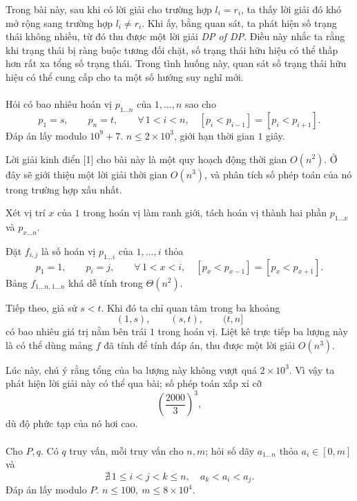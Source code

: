 \documentclass[11pt]{article}
\begin{document}
Trong bài này, sau khi có lời giải cho trường hợp \(l_i=r_i\), ta thấy lời
giải đó khó mở rộng sang trường hợp \(l_i\ne r_i\). Khi ấy, bằng quan sát, ta
phát hiện số trạng thái không nhiều, từ đó thu được một lời giải
\emph{DP of DP}. Điều này nhắc ta rằng khi trạng thái bị ràng buộc tương đối
chặt, số trạng thái hữu hiệu có thể thấp hơn rất xa tổng số trạng thái. Trong
tình huống này, quan sát số trạng thái hữu hiệu có thể cung cấp cho ta một số
hướng suy nghĩ mới.

\paragraph{}
Hỏi có bao nhiêu hoán vị \(p_{1\ldots n}\) của \(1,\ldots,n\) sao cho
\[
  p_1=s,\qquad p_n=t,\qquad
  \forall\,1<i<n,\quad [p_i<p_{i-1}]=[p_i<p_{i+1}].
\]
Đáp án lấy modulo \(10^9+7\). \(n\le 2\times 10^3\), giới hạn thời gian
\(1\) giây.

Lời giải kinh điển [1] cho bài này là một quy hoạch động thời gian \(O(n^2)\).
Ở đây sẽ giới thiệu một lời giải thời gian \(O(n^3)\), và phân tích số phép
toán của nó trong trường hợp xấu nhất.

Xét vị trí \(x\) của \(1\) trong hoán vị làm ranh giới, tách hoán vị thành hai
phần \(p_{1\ldots x}\) và \(p_{x\ldots n}\).

Đặt \(f_{i,j}\) là số hoán vị \(p_{1\ldots i}\) của \(1,\ldots,i\) thỏa
\[
  p_1=1,\qquad p_i=j,\qquad
  \forall\,1<x<i,\quad [p_x<p_{x-1}]=[p_x<p_{x+1}].
\]
Bảng \(f_{1\ldots n,1\ldots n}\) khá dễ tính trong \(\Theta(n^2)\).

Tiếp theo, giả sử \(s<t\). Khi đó ta chỉ quan tâm trong ba khoảng
\[
  (1,s),\qquad (s,t),\qquad (t,n]
\]
có bao nhiêu giá trị nằm bên trái \(1\) trong hoán vị. Liệt kê trực tiếp ba
lượng này là có thể dùng mảng \(f\) đã tính để tính đáp án, thu được một lời
giải \(O(n^3)\).

Lúc này, chú ý rằng tổng của ba lượng này không vượt quá \(2\times 10^3\). Vì
vậy ta phát hiện lời giải này có thể qua bài; số phép toán xấp xỉ cỡ
\[
  \left(\frac{2000}{3}\right)^3,
\]
dù độ phức tạp của nó hơi cao.

\paragraph{}
Cho \(P,q\). Có \(q\) truy vấn, mỗi truy vấn cho \(n,m\); hỏi số dãy
\(a_{1\ldots n}\) thỏa \(a_i\in[0,m]\) và
\[
  \nexists\,1\le i<j<k\le n,\quad a_k<a_i<a_j.
\]
Đáp án lấy modulo \(P\). \(n\le 100,\ m\le 8\times 10^4\).
\end{document}
